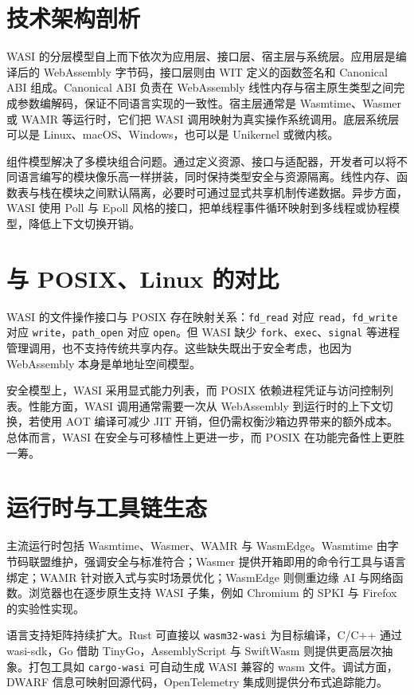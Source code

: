 \chapter{技术架构剖析}
WASI 的分层模型自上而下依次为应用层、接口层、宿主层与系统层。应用层是编译后的 WebAssembly 字节码，接口层则由 WIT 定义的函数签名和 Canonical ABI 组成。Canonical ABI 负责在 WebAssembly 线性内存与宿主原生类型之间完成参数编解码，保证不同语言实现的一致性。宿主层通常是 Wasmtime、Wasmer 或 WAMR 等运行时，它们把 WASI 调用映射为真实操作系统调用。底层系统层可以是 Linux、macOS、Windows，也可以是 Unikernel 或微内核。\par
组件模型解决了多模块组合问题。通过定义资源、接口与适配器，开发者可以将不同语言编写的模块像乐高一样拼装，同时保持类型安全与资源隔离。线性内存、函数表与栈在模块之间默认隔离，必要时可通过显式共享机制传递数据。异步方面，WASI 使用 Poll 与 Epoll 风格的接口，把单线程事件循环映射到多线程或协程模型，降低上下文切换开销。\par
\chapter{与 POSIX、Linux 的对比}
WASI 的文件操作接口与 POSIX 存在映射关系：\texttt{fd\_{}read} 对应 \texttt{read}，\texttt{fd\_{}write} 对应 \texttt{write}，\texttt{path\_{}open} 对应 \texttt{open}。但 WASI 缺少 \texttt{fork}、\texttt{exec}、\texttt{signal} 等进程管理调用，也不支持传统共享内存。这些缺失既出于安全考虑，也因为 WebAssembly 本身是单地址空间模型。\par
安全模型上，WASI 采用显式能力列表，而 POSIX 依赖进程凭证与访问控制列表。性能方面，WASI 调用通常需要一次从 WebAssembly 到运行时的上下文切换，若使用 AOT 编译可减少 JIT 开销，但仍需权衡沙箱边界带来的额外成本。总体而言，WASI 在安全与可移植性上更进一步，而 POSIX 在功能完备性上更胜一筹。\par
\chapter{运行时与工具链生态}
主流运行时包括 Wasmtime、Wasmer、WAMR 与 WasmEdge。Wasmtime 由字节码联盟维护，强调安全与标准符合；Wasmer 提供开箱即用的命令行工具与语言绑定；WAMR 针对嵌入式与实时场景优化；WasmEdge 则侧重边缘 AI 与网络函数。浏览器也在逐步原生支持 WASI 子集，例如 Chromium 的 SPKI 与 Firefox 的实验性实现。\par
语言支持矩阵持续扩大。Rust 可直接以 \texttt{wasm32-wasi} 为目标编译，C/C++ 通过 wasi-sdk，Go 借助 TinyGo，AssemblyScript 与 SwiftWasm 则提供更高层次抽象。打包工具如 \texttt{cargo-wasi} 可自动生成 WASI 兼容的 wasm 文件。调试方面，DWARF 信息可映射回源代码，OpenTelemetry 集成则提供分布式追踪能力。\par
